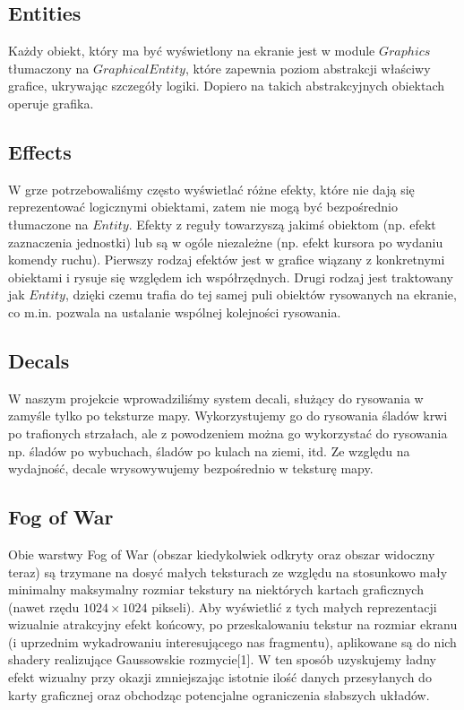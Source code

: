 \documentclass[licencjacka]{pracamgr}
\begin{document}
    \subsection{Entities}
      Każdy obiekt, który ma być wyświetlony na ekranie jest w module $Graphics$ tłumaczony na $GraphicalEntity$, które
      zapewnia poziom abstrakcji właściwy grafice, ukrywając szczegóły logiki. Dopiero na takich abstrakcyjnych
      obiektach operuje grafika.

    \subsection{Effects}
      W grze potrzebowaliśmy często wyświetlać różne efekty, które nie dają się reprezentować logicznymi obiektami,
      zatem nie mogą być bezpośrednio tłumaczone na $Entity$. Efekty z reguły towarzyszą jakimś obiektom (np. efekt
      zaznaczenia jednostki) lub są w ogóle niezależne (np. efekt kursora po wydaniu komendy ruchu). Pierwszy rodzaj
      efektów jest w grafice wiązany z konkretnymi obiektami i rysuje się względem ich współrzędnych. Drugi rodzaj jest
      traktowany jak $Entity$, dzięki czemu trafia do tej samej puli obiektów rysowanych na ekranie, co m.in. pozwala na
      ustalanie wspólnej kolejności rysowania.

    \subsection{Decals}
      W naszym projekcie wprowadziliśmy system decali, służący do rysowania w zamyśle tylko po teksturze mapy.
      Wykorzystujemy go do rysowania śladów krwi po trafionych strzałach, ale z powodzeniem można go wykorzystać do
      rysowania np. śladów po wybuchach, śladów po kulach na ziemi, itd. Ze względu na wydajność, decale wrysowywujemy
      bezpośrednio w teksturę mapy.

    \subsection{Fog of War}
      Obie warstwy Fog of War (obszar kiedykolwiek odkryty oraz obszar widoczny teraz) są trzymane na dosyć małych
      teksturach ze względu na stosunkowo mały minimalny maksymalny rozmiar tekstury na niektórych kartach graficznych
      (nawet rzędu $1024 \times 1024$ pikseli). Aby wyświetlić z tych małych reprezentacji wizualnie atrakcyjny efekt
      końcowy, po przeskalowaniu tekstur na rozmiar ekranu (i uprzednim wykadrowaniu interesującego nas fragmentu),
      aplikowane są do nich shadery realizujące Gaussowskie rozmycie[1]. W ten sposób uzyskujemy ładny efekt wizualny
      przy okazji zmniejszając istotnie ilość danych przesyłanych do karty graficznej oraz obchodząc potencjalne
      ograniczenia słabszych układów.
\end{document}
